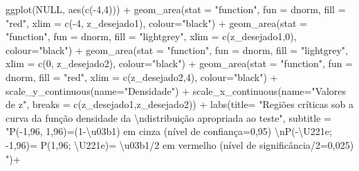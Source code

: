 \documentclass[
]{book}
\newenvironment{Shaded}{\begin{snugshade}}{\end{snugshade}}
\newcommand{\AttributeTok}[1]{\textcolor[rgb]{0.77,0.63,0.00}{#1}}
\newcommand{\ConstantTok}[1]{\textcolor[rgb]{0.00,0.00,0.00}{#1}}
\newcommand{\DecValTok}[1]{\textcolor[rgb]{0.00,0.00,0.81}{#1}}
\newcommand{\FunctionTok}[1]{\textcolor[rgb]{0.00,0.00,0.00}{#1}}
\newcommand{\NormalTok}[1]{#1}
\newcommand{\SpecialCharTok}[1]{\textcolor[rgb]{0.00,0.00,0.00}{#1}}
\newcommand{\StringTok}[1]{\textcolor[rgb]{0.31,0.60,0.02}{#1}}
\begin{document}
\begin{Shaded}
\begin{Highlighting}[]
\FunctionTok{ggplot}\NormalTok{(}\ConstantTok{NULL}\NormalTok{, }\FunctionTok{aes}\NormalTok{(}\FunctionTok{c}\NormalTok{(}\SpecialCharTok{{-}}\DecValTok{4}\NormalTok{,}\DecValTok{4}\NormalTok{))) }\SpecialCharTok{+}
  \FunctionTok{geom\_area}\NormalTok{(}\AttributeTok{stat =} \StringTok{"function"}\NormalTok{, }
            \AttributeTok{fun =}\NormalTok{ dnorm, }
            \AttributeTok{fill =} \StringTok{"red"}\NormalTok{, }
            \AttributeTok{xlim =} \FunctionTok{c}\NormalTok{(}\SpecialCharTok{{-}}\DecValTok{4}\NormalTok{, z\_desejado1),}
            \AttributeTok{colour=}\StringTok{"black"}\NormalTok{) }\SpecialCharTok{+}
  \FunctionTok{geom\_area}\NormalTok{(}\AttributeTok{stat =} \StringTok{"function"}\NormalTok{, }
            \AttributeTok{fun =}\NormalTok{ dnorm, }
            \AttributeTok{fill =} \StringTok{"lightgrey"}\NormalTok{, }
            \AttributeTok{xlim =} \FunctionTok{c}\NormalTok{(z\_desejado1,}\DecValTok{0}\NormalTok{),}
            \AttributeTok{colour=}\StringTok{"black"}\NormalTok{) }\SpecialCharTok{+}
  \FunctionTok{geom\_area}\NormalTok{(}\AttributeTok{stat =} \StringTok{"function"}\NormalTok{, }
            \AttributeTok{fun =}\NormalTok{ dnorm, }
            \AttributeTok{fill =} \StringTok{"lightgrey"}\NormalTok{, }
            \AttributeTok{xlim =} \FunctionTok{c}\NormalTok{(}\DecValTok{0}\NormalTok{, z\_desejado2),}
            \AttributeTok{colour=}\StringTok{"black"}\NormalTok{) }\SpecialCharTok{+}
  \FunctionTok{geom\_area}\NormalTok{(}\AttributeTok{stat =} \StringTok{"function"}\NormalTok{, }
            \AttributeTok{fun =}\NormalTok{ dnorm, }
            \AttributeTok{fill =} \StringTok{"red"}\NormalTok{, }
            \AttributeTok{xlim =} \FunctionTok{c}\NormalTok{(z\_desejado2,}\DecValTok{4}\NormalTok{),}
            \AttributeTok{colour=}\StringTok{"black"}\NormalTok{) }\SpecialCharTok{+}
  \FunctionTok{scale\_y\_continuous}\NormalTok{(}\AttributeTok{name=}\StringTok{"Densidade"}\NormalTok{) }\SpecialCharTok{+}
  \FunctionTok{scale\_x\_continuous}\NormalTok{(}\AttributeTok{name=}\StringTok{"Valores de z"}\NormalTok{, }\AttributeTok{breaks =} \FunctionTok{c}\NormalTok{(z\_desejado1,z\_desejado2))  }\SpecialCharTok{+}
  \FunctionTok{labs}\NormalTok{(}\AttributeTok{title=} 
         \StringTok{"Regiões críticas sob a curva da função densidade da }\SpecialCharTok{\textbackslash{}n}\StringTok{distribuição apropriada ao teste"}\NormalTok{, }
       \AttributeTok{subtitle =} \StringTok{"P({-}1,96, 1,96)=(1{-}\textbackslash{}u03b1) em cinza (nível de confiança=0,95) }\SpecialCharTok{\textbackslash{}n}\StringTok{P({-}\textbackslash{}U221e; {-}1,96)= P(1,96; \textbackslash{}U221e)= \textbackslash{}u03b1/2 em vermelho (nível de significância/2=0,025) "}\NormalTok{)}\SpecialCharTok{+}

\end{Highlighting}
\end{Shaded}
\end{document}
